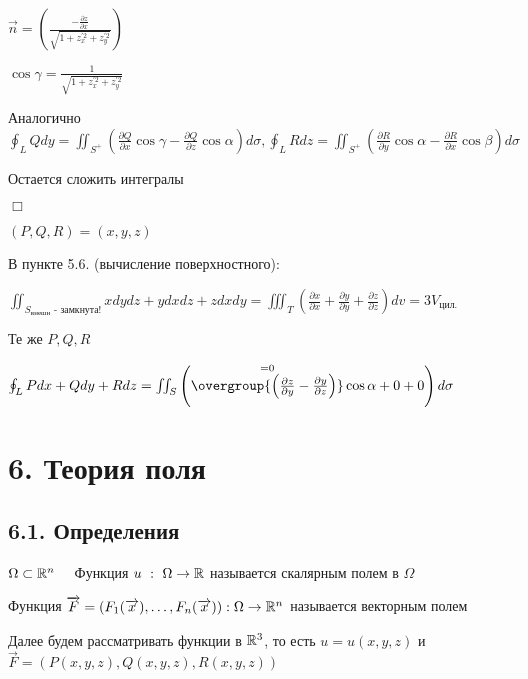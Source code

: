 \documentclass[12pt]{article}
\begin{document}
    $\overrightarrow{n} = \left(\frac{-\frac{\partial z}{\partial x}}{\sqrt{1 + z_x^{\prime 2} + z_y^{\prime 2}}}\right)$

    $\cos\gamma = \frac{1}{\sqrt{1 + z_x^{\prime 2} + z_y^{\prime 2}}}$

    Аналогично $\oint_L Qdy = \iint_{S^+} \left(\frac{\partial Q}{\partial x}\cos\gamma - \frac{\partial Q}{\partial z}\cos\alpha\right) d\sigma,
    \oint_L Rdz = \iint_{S^+} \left(\frac{\partial R}{\partial y}\cos\alpha - \frac{\partial R}{\partial x}\cos\beta\right) d\sigma$

    Остается сложить интегралы

    $\Box$

     $(P, Q, R) = (x, y, z)$

    В \Exs пункте 5.6. (вычисление поверхностного):

    $\iint_{S_{\text{внешн}} \text{ - замкнута!}} xdydz + ydxdz + zdxdy = \iiint_T \left(\frac{\partial x}{\partial x} + \frac{\partial y}{\partial y} + \frac{\partial z}{\partial z}\right) dv = 3V_{\text{цил.}}$

     Те же $P, Q, R$

    $\oint_L Pdx + Qdy + Rdz = \iint_{S} \left(\overset{= 0}{\overgroup{\left(\frac{\partial z}{\partial y} - \frac{\partial y}{\partial z}\right)}} \cos\alpha + 0 + 0\right) d\sigma$

    \clearpage


    \section{6. Теория поля}

    \subsection{6.1. Определения}

    \hypertarget{scalarfield}{}

     $\Omega \subset \mathbb{R}^n \quad$ Функция $u \ : \ \Omega \to \mathbb{R}$ называется скалярным полем в $\Omega$

    \hypertarget{vectorfield}{}

     Функция $\overrightarrow{F} = (F_1(\overrightarrow{x}), \dots, F_n(\overrightarrow{x})) : \Omega \to \mathbb{R}^n$ называется векторным полем

    \Nota Далее будем рассматривать функции в $\mathbb{R}^3$, то есть $u = u(x, y, z)$ и $\overrightarrow{F} = (P(x, y, z), Q(x, y, z), R(x, y, z))$
\end{document}
